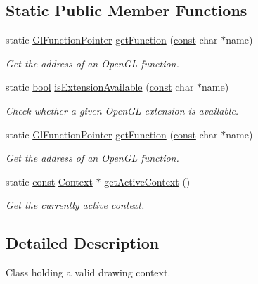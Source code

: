 \subsection*{Static Public Member Functions}
\begin{DoxyCompactItemize}
\item 
static \hyperlink{namespacesf_ad4f831952db30b6fd35330c7af581737}{Gl\-Function\-Pointer} \hyperlink{classsf_1_1_context_a998980d311effdf6223ce40d934c23c3}{get\-Function} (\hyperlink{term__entry_8h_a57bd63ce7f9a353488880e3de6692d5a}{const} char $\ast$name)
\begin{DoxyCompactList}\small\item\em Get the address of an Open\-G\-L function. \end{DoxyCompactList}\item 
static \hyperlink{term__entry_8h_a002004ba5d663f149f6c38064926abac}{bool} \hyperlink{classsf_1_1_context_a163c7f72c0c20133606657d895faa147}{is\-Extension\-Available} (\hyperlink{term__entry_8h_a57bd63ce7f9a353488880e3de6692d5a}{const} char $\ast$name)
\begin{DoxyCompactList}\small\item\em Check whether a given Open\-G\-L extension is available. \end{DoxyCompactList}\item 
static \hyperlink{namespacesf_ad4f831952db30b6fd35330c7af581737}{Gl\-Function\-Pointer} \hyperlink{classsf_1_1_context_a998980d311effdf6223ce40d934c23c3}{get\-Function} (\hyperlink{term__entry_8h_a57bd63ce7f9a353488880e3de6692d5a}{const} char $\ast$name)
\begin{DoxyCompactList}\small\item\em Get the address of an Open\-G\-L function. \end{DoxyCompactList}\item 
static \hyperlink{term__entry_8h_a57bd63ce7f9a353488880e3de6692d5a}{const} \hyperlink{classsf_1_1_context}{Context} $\ast$ \hyperlink{classsf_1_1_context_a26ec3ddaf11a37c0630624037c4eea2d}{get\-Active\-Context} ()
\begin{DoxyCompactList}\small\item\em Get the currently active context. \end{DoxyCompactList}\end{DoxyCompactItemize}


\subsection{Detailed Description}
Class holding a valid drawing context. 

